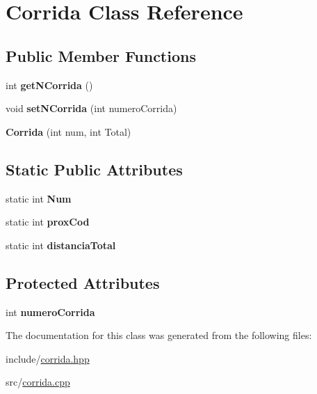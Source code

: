\hypertarget{classCorrida}{}\section{Corrida Class Reference}
\label{classCorrida}
\subsection*{Public Member Functions}
\begin{DoxyCompactItemize}
\item 
\mbox{\label{classCorrida_a396dd3734f406a82eceecfcea52c53a9}} 
int {\bfseries get\+N\+Corrida} ()
\item 
\mbox{\label{classCorrida_a054cf112c308842c323bba58704a27af}} 
void {\bfseries set\+N\+Corrida} (int numero\+Corrida)
\item 
\mbox{\label{classCorrida_a80dff90eba14a14c9b7bd3f0e2875df6}} 
{\bfseries Corrida} (int num, int Total)
\end{DoxyCompactItemize}
\subsection*{Static Public Attributes}
\begin{DoxyCompactItemize}
\item 
\mbox{\label{classCorrida_a8bddfcf4a2c7d6489f3298293ebc9c14}} 
static int {\bfseries Num}
\item 
\mbox{\label{classCorrida_a92db60482b963e96bbf3510049bf22a4}} 
static int {\bfseries prox\+Cod}
\item 
\mbox{\label{classCorrida_a81c5cb12ffa9f6b11d1b2524c1fe97a0}} 
static int {\bfseries distancia\+Total}
\end{DoxyCompactItemize}
\subsection*{Protected Attributes}
\begin{DoxyCompactItemize}
\item 
\mbox{\label{classCorrida_ac91d9c0dcbe76ac3010b2cec564c3ce9}} 
int {\bfseries numero\+Corrida}
\end{DoxyCompactItemize}


The documentation for this class was generated from the following files\+:\begin{DoxyCompactItemize}
\item 
include/\hyperlink{corrida_8hpp}{corrida.\+hpp}\item 
src/\hyperlink{corrida_8cpp}{corrida.\+cpp}\end{DoxyCompactItemize}
